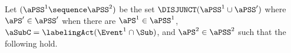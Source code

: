 \begin{definition}
  \label{def:semi:seq}
  






  

  Let $(\aPSS^1 \sequence \aPSS^2)$ be the set
  \begin{math}
    \DISJUNCT(\aPSS^1
    \cup
    \aPSS')
  \end{math}
  where $\aPS'\in\aPSS'$ when there are $\aPS^1 \in \aPSS^1$,
  $\aSubC=\labelingAct(\Event^1\cap\Sub)$, 
  and $\aPS^2\in\aPSS^2$
  such that the following hold.


\end{definition}
